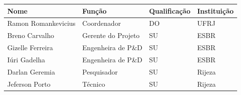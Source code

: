 \cleardoublepage

\begin{onecolumn}
\thispagestyle{empty}


\begin{center}

  
 \vfill



  
  \vspace{0.50cm}



  \begin{center}
    \begin{tabular}{| l | l | l | l |}
    
    \hline
   	 Nome 					& Função			 & Qualificação 	& Instituição	 \\\hline
   	 Ramon Romankevicius 	& Coordenador 	 	 & DO			    & UFRJ  	\\\hline		
	 Breno Carvalho			& Gerente do Projeto & SU 			    & ESBR 		\\\hline
	 Gizelle Ferreira 		& Engenheira de P\&D & SU 				& ESBR 		\\\hline
	 Iúri Gadelha	 		& Engenheira de P\&D & SU 				& ESBR 		\\\hline
	 Darlan Geremia 		& Pesquisador		 & SU 				& Rijeza 	\\\hline
	 Jeferson Porto  		& Técnico			 & SU 				& Rijeza 	\\\hline
	  
\hline

    
    \hline 
    \end{tabular}
\end{center}

\end{center}
\end{onecolumn}

\newpage

\hypersetup{pageanchor=true}

